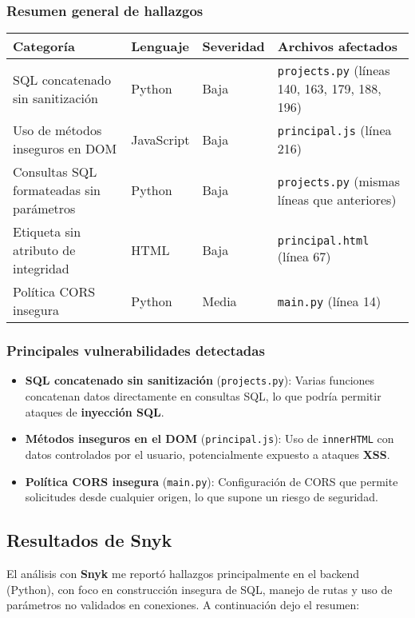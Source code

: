 \documentclass[12pt, a4paper]{article}
\begin{document}
\subsubsection*{Resumen general de hallazgos}
\begin{table}[h!]
\footnotesize
\centering
\begin{tabularx}{\textwidth}{@{} L{3.6cm} L{2.2cm} L{2.2cm} Y @{}}
\toprule
\textbf{Categoría} & \textbf{Lenguaje} & \textbf{Severidad} & \textbf{Archivos afectados} \\
\midrule
SQL concatenado sin sanitización & Python & Baja & \texttt{projects.py} (líneas 140, 163, 179, 188, 196) \\
Uso de métodos inseguros en DOM & JavaScript & Baja & \texttt{principal.js} (línea 216) \\
Consultas SQL formateadas sin parámetros & Python & Baja & \texttt{projects.py} (mismas líneas que anteriores) \\
Etiqueta sin atributo de integridad & HTML & Baja & \texttt{principal.html} (línea 67) \\
Política CORS insegura & Python & Media & \texttt{main.py} (línea 14) \\
\bottomrule
\end{tabularx}
\end{table}

\subsubsection*{Principales vulnerabilidades detectadas}
\begin{itemize}
    \item \textbf{SQL concatenado sin sanitización} (\texttt{projects.py}):  
    Varias funciones concatenan datos directamente en consultas SQL, lo que podría permitir ataques de \textbf{inyección SQL}.
    \item \textbf{Métodos inseguros en el DOM} (\texttt{principal.js}):  
    Uso de \texttt{innerHTML} con datos controlados por el usuario, potencialmente expuesto a ataques \textbf{XSS}.
    \item \textbf{Política CORS insegura} (\texttt{main.py}):  
    Configuración de CORS que permite solicitudes desde cualquier origen, lo que supone un riesgo de seguridad.
\end{itemize}

\subsection{Resultados de Snyk}
El análisis con \textbf{Snyk} me reportó hallazgos principalmente en el backend (Python), con foco en construcción 
insegura de SQL, manejo de rutas y uso de parámetros no validados en conexiones. A continuación dejo el resumen:
\end{document}
